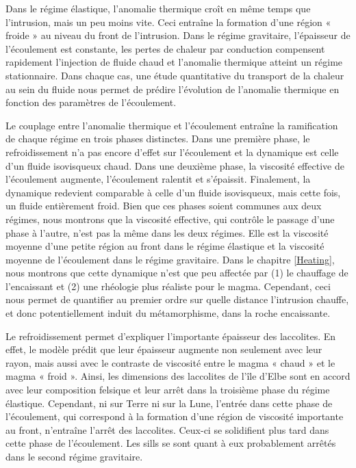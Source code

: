 Dans le régime élastique, l’anomalie thermique croît en même temps que
l’intrusion, mais un peu moins vite. Ceci entraîne la
formation d’une région « froide » au niveau du front de
l’intrusion. Dans le régime gravitaire, l’épaisseur de l’écoulement
est constante, les pertes de chaleur par conduction compensent
rapidement l’injection de fluide chaud et l’anomalie thermique atteint
un régime stationnaire. Dans chaque cas, une étude quantitative du
transport de la chaleur au sein du fluide nous permet de prédire
l’évolution de l’anomalie thermique en fonction des paramètres de
l’écoulement.

Le couplage entre l'anomalie thermique et l'écoulement entraîne la
ramification de chaque régime en trois phases distinctes. Dans une
première phase, le refroidissement n'a pas encore d'effet sur
l'écoulement et la dynamique est celle d'un fluide isovisqueux chaud.
Dans une deuxième phase, la viscosité effective de l'écoulement
augmente, l’écoulement ralentit et s’épaissit. Finalement, la
dynamique redevient comparable à celle d'un fluide isovisqueux, mais
cette fois, un fluide entièrement froid. Bien que ces phases soient
communes aux deux régimes, nous montrons que la viscosité effective,
qui contrôle le passage d'une phase à l'autre, n’est pas la même dans
les deux régimes. Elle est la viscosité moyenne d’une petite région
au front dans le régime élastique et la viscosité moyenne de
l’écoulement dans le régime gravitaire. Dans le chapitre
\ref{Heating}, nous montrons que cette dynamique n’est que peu
affectée par (1) le chauffage de l’encaissant et (2) une rhéologie
plus réaliste pour le magma. Cependant, ceci nous permet de quantifier
au premier ordre sur quelle distance l'intrusion chauffe, et donc
potentiellement induit du métamorphisme, dans la roche encaissante.

Le  refroidissement  permet  d'expliquer  l'importante  épaisseur  des
laccolites. En effet, le modèle prédit que leur épaisseur augmente non
seulement avec leur  rayon, mais aussi avec le  contraste de viscosité
entre le magma « chaud » et  le magma « froid ». Ainsi, les dimensions
des laccolites  de l’île d’Elbe  sont en accord avec  leur composition
felsique   et  leur   arrêt  dans   la  troisième   phase  du   régime
élastique. Cependant, ni sur Terre ni sur la Lune, l'entrée dans cette
phase de l'écoulement,  qui correspond à la formation  d’une région de
viscosité    importante    au    front,   n’entraîne    l'arrêt    des
laccolites.  Ceux-ci se  solidifient  plus tard  dans  cette phase  de
l'écoulement. Les sills se sont  quant à eux probablement arrêtés dans
le second régime gravitaire.

